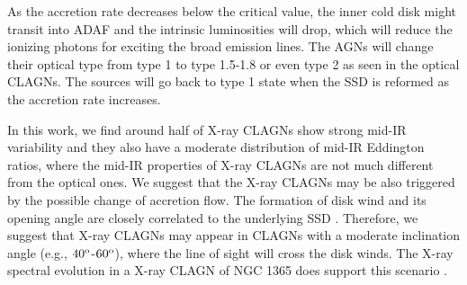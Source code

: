 \documentclass[linenumbers]{aastex631}
\begin{document}
As the accretion rate decreases below the critical value, the inner cold disk might transit into ADAF and the intrinsic luminosities will drop, which will reduce the ionizing photons for exciting the broad emission lines. The AGNs will change their optical type from type 1 to type 1.5-1.8 or even type 2 as seen in the optical CLAGNs. The sources will go back to type 1 state when the SSD is reformed as the accretion rate increases. 

In this work, we find around half of X-ray CLAGNs show strong mid-IR variability and they also have a moderate distribution of mid-IR Eddington ratios, where the mid-IR properties of X-ray CLAGNs are not much different from the optical ones. We suggest that the X-ray CLAGNs may be also triggered by the possible change of accretion flow. The formation of disk wind and its opening angle are closely correlated to the underlying SSD \citep[e.g.,][]{2017PASA...34...42Y,2020MNRAS.492.5540M}. Therefore, we suggest that X-ray CLAGNs may appear in CLAGNs with a moderate inclination angle (e.g., $40^{\rm o}$-$60^{\rm o}$), where the line of sight will cross the disk winds. The X-ray spectral evolution in a X-ray CLAGN of NGC 1365 does support this scenario \citep[e.g.,][]{2014MNRAS.440.3503C,2021RAA....21..199L}.
\end{document}
